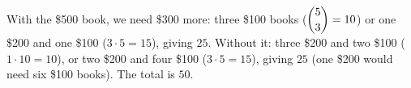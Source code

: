 With the \$500 book, we need \$300 more: three \$100 books ($\dbinom53=10$) or one \$200 and one \$100 ($3\cdot5=15$), giving $25$. Without it: three \$200 and two \$100 ($1\cdot10=10$), or two \$200 and four \$100 ($3\cdot5=15$), giving $25$ (one \$200 would need six \$100 books). The total is $\boxed{50}$.
